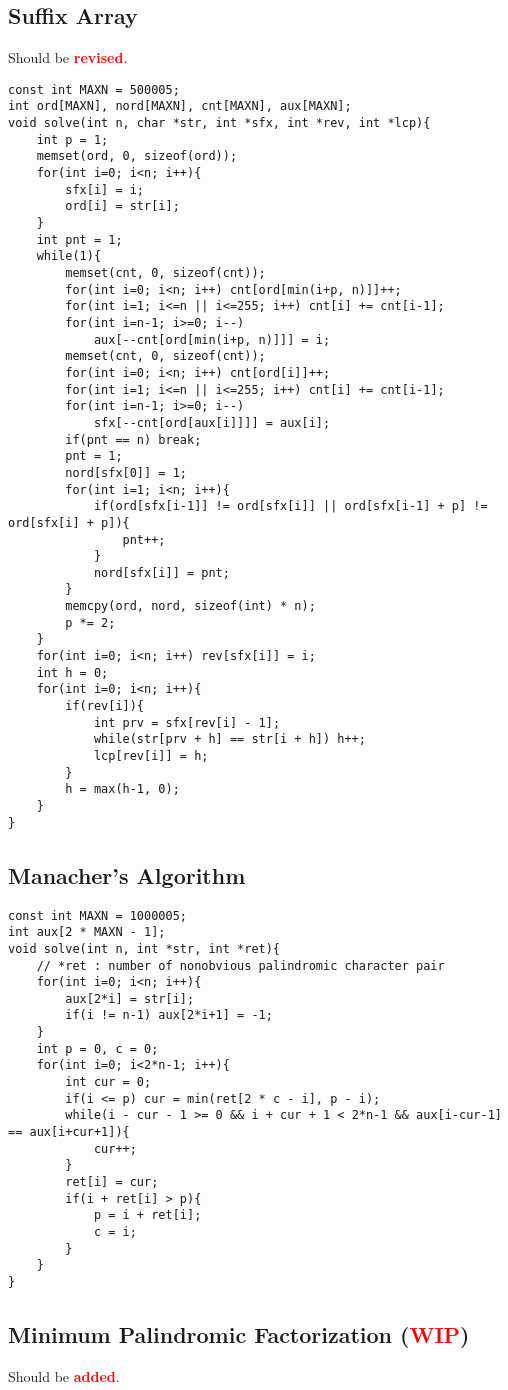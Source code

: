 \documentclass[landscape, 8pt, a4paper, oneside,  twocolumn]{extarticle}
\newcommand{\revised}{Should be \textcolor{red}{\textbf{revised}}.}
\newcommand{\added}{Should be \textcolor{red}{\textbf{added}}.}
\newcommand{\WIP}{\textcolor{red}{\textbf{WIP}}}
\begin{document}
\subsection{Suffix Array}
\revised %
\begin{verbatim}
const int MAXN = 500005;
int ord[MAXN], nord[MAXN], cnt[MAXN], aux[MAXN];
void solve(int n, char *str, int *sfx, int *rev, int *lcp){
	int p = 1;
	memset(ord, 0, sizeof(ord));
	for(int i=0; i<n; i++){
		sfx[i] = i;
		ord[i] = str[i];
	}
	int pnt = 1;
	while(1){
		memset(cnt, 0, sizeof(cnt));
		for(int i=0; i<n; i++) cnt[ord[min(i+p, n)]]++;
		for(int i=1; i<=n || i<=255; i++) cnt[i] += cnt[i-1];
		for(int i=n-1; i>=0; i--) 
			aux[--cnt[ord[min(i+p, n)]]] = i;
		memset(cnt, 0, sizeof(cnt));
		for(int i=0; i<n; i++) cnt[ord[i]]++;
		for(int i=1; i<=n || i<=255; i++) cnt[i] += cnt[i-1];
		for(int i=n-1; i>=0; i--) 
			sfx[--cnt[ord[aux[i]]]] = aux[i];
		if(pnt == n) break;
		pnt = 1;
		nord[sfx[0]] = 1;
		for(int i=1; i<n; i++){
			if(ord[sfx[i-1]] != ord[sfx[i]] || ord[sfx[i-1] + p] != ord[sfx[i] + p]){
				pnt++;
			}
			nord[sfx[i]] = pnt;
		}
		memcpy(ord, nord, sizeof(int) * n);
		p *= 2;
	}
	for(int i=0; i<n; i++) rev[sfx[i]] = i;
	int h = 0;
	for(int i=0; i<n; i++){
		if(rev[i]){
			int prv = sfx[rev[i] - 1];
			while(str[prv + h] == str[i + h]) h++;
			lcp[rev[i]] = h;
		}
		h = max(h-1, 0);
	}
}
\end{verbatim}
\subsection{Manacher's Algorithm}
\begin{verbatim}
const int MAXN = 1000005;
int aux[2 * MAXN - 1];
void solve(int n, int *str, int *ret){
	// *ret : number of nonobvious palindromic character pair 
	for(int i=0; i<n; i++){
		aux[2*i] = str[i];
		if(i != n-1) aux[2*i+1] = -1;
	}
	int p = 0, c = 0;
	for(int i=0; i<2*n-1; i++){
		int cur = 0;
		if(i <= p) cur = min(ret[2 * c - i], p - i);
		while(i - cur - 1 >= 0 && i + cur + 1 < 2*n-1 && aux[i-cur-1] == aux[i+cur+1]){
			cur++;
		}
		ret[i] = cur;
		if(i + ret[i] > p){
			p = i + ret[i];
			c = i;
		}
	}
}
\end{verbatim}

\subsection{Minimum Palindromic Factorization (\WIP)}
\added
\end{document}
